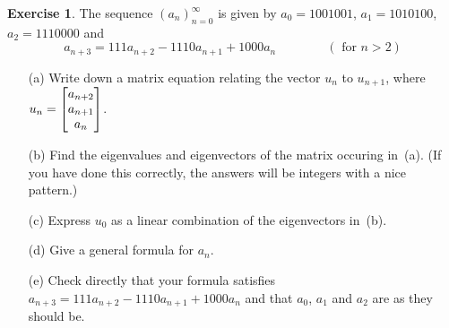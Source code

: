 \documentclass[a4paper]{amsart}
\theoremstyle{definition}
\newtheorem{exercise}{Exercise}
\begin{document}
\begin{exercise}\label{ex-diffeq-ii}
 The sequence $(a_n)_{n=0}^\infty$ is given by 
 $a_0=1001001$, $a_1=1010100$, $a_2=1110000$ and 
 \[ a_{n+3} = 111 a_{n+2} - 1110 a_{n+1} + 1000 a_n
   \hspace{4em} (\text{ for } n>2)
 \] 
 \begin{itemize}
  \item[(a)] Write down a matrix equation relating the vector $u_n$ to
   $u_{n+1}$, where $u_n=\left[\begin{matrix} a_{n+2}\\ a_{n+1}\\ a_n\end{matrix}\right]$.
  \item[(b)] Find the eigenvalues and eigenvectors of the matrix
   occuring in~(a).  (If you have done this correctly, the answers
   will be integers with a nice pattern.)
  \item[(c)] Express $u_0$ as a linear combination of the eigenvectors
   in~(b).
  \item[(d)] Give a general formula for $a_n$.
  \item[(e)] Check directly that your formula satisfies
   $a_{n+3}=111a_{n+2}-1110 a_{n+1}+1000a_n$ and that $a_0$, $a_1$ and
   $a_2$ are as they should be.
 \end{itemize}
\end{exercise}
\end{document}
